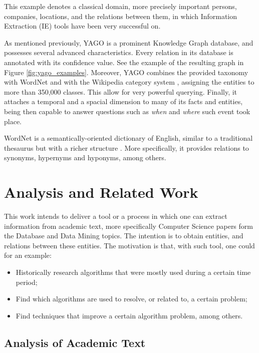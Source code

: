 \documentclass[11pt,a4paper,openright]{memoir}
\begin{document}
This example denotes a classical domain, more precisely important persons, companies, locations, and the relations between them, in which Information Extraction (IE) tools have been very successful on.

As mentioned previously, YAGO \cite{Suchanek2007} is a prominent Knowledge Graph database, and possesses several advanced characteristics. Every relation in its database is annotated with its confidence value. See the example of the resulting graph in Figure \ref{fig:yago_examples}. Moreover, YAGO combines the provided taxonomy with WordNet \cite{Miller:1995:WLD:219717.219748} and with the Wikipedia category system \cite{wiki}, assigning the entities to more than 350,000 classes. This allow for very powerful querying. Finally, it attaches a temporal and a spacial dimension to many of its facts and entities, being then capable to answer questions such as \emph{when} and \emph{where} such event took place.

WordNet is a semantically-oriented dictionary of English, similar to a traditional thesaurus but with a richer structure \cite{BirdKleinLoper09}. More specifically, it provides relations to synonyms, hypernyms and hyponyms, among others.


%
%
%
%


\chapter{Analysis and Related Work}

This work intends to deliver a tool or a process in which one can extract information from academic text, more specifically Computer Science papers form the Database and Data Mining topics. The intention is to obtain entities, and relations between these entities. The motivation is that, with such tool, one could for an example:
\begin{itemize}
	\item Historically research algorithms that were mostly used during a certain time period;
	\item Find which algorithms are used to resolve, or related to, a certain problem;
	\item Find techniques that improve a certain algorithm problem, among others.
\end{itemize}

\section{Analysis of Academic Text}
\label{section:analysis_of_academic_text}
\end{document}
